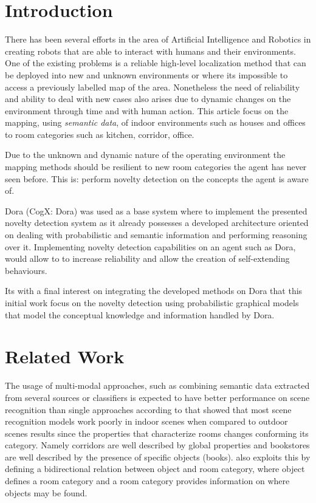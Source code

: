 \documentclass[runningheads,a4paper]{llncs}
\begin{document}
\section{Introduction}
There has been several efforts in the area of Artificial Intelligence and Robotics
in creating robots that are able to interact with humans and their environments.
One of the existing problems is a reliable high-level localization method that can
be deployed into new and unknown environments or where its impossible to access a
previously labelled map of the area. Nonetheless the need of reliability and ability
to deal with new cases also arises due to dynamic changes on the environment through
time and with human action.
This article focus on the mapping, using \emph{semantic data}, of indoor
environments such as houses and offices to room categories such as kitchen,
corridor, office.

Due to the unknown and dynamic nature of the operating environment the
mapping methods should be resilient to new room categories the agent has never seen
before. This is: perform novelty detection on the concepts the agent is aware of.

Dora\cite{dora} (CogX: Dora) was used as a base system where to implement the
presented novelty detection system as it already possesses a developed architecture
oriented on dealing with probabilistic and semantic information and performing
reasoning over it.
Implementing novelty detection capabilities on an agent such as Dora, would allow to
to increase reliability and allow the creation of self-extending behaviours.

Its with a final interest on integrating the developed methods on Dora that this
initial work focus on the novelty detection using probabilistic graphical models
that model the conceptual knowledge and information handled by Dora.


\section{Related Work}
The usage of multi-modal approaches, such as combining semantic data extracted from
several sources or classifiers is expected to have better performance on scene
recognition than single approaches according to \cite{quattoni2009recognizing}
that showed that most scene recognition models work poorly in indoor scenes when
compared to outdoor scenes results since the properties that
characterize rooms changes conforming its category. Namely corridors are well
described by global properties and bookstores are well described by the presence of
specific objects (books).
\cite{galindo2005multi} also exploits this by defining a bidirectional relation
between object and room category, where object defines a room category and a room
category provides information on where objects may be found.
\end{document}
